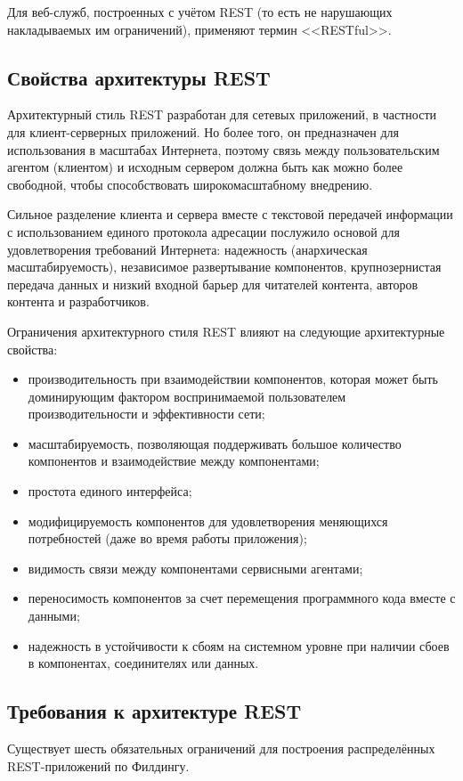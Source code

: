\documentclass[a4page]{article}
\begin{document}
Для веб-служб, построенных с учётом REST (то есть не нарушающих накладываемых им ограничений),
применяют термин <<RESTful>>.

\subsection{Свойства архитектуры REST}
Архитектурный стиль REST разработан для сетевых приложений,
в частности для клиент-серверных приложений.
Но более того, он предназначен для использования в масштабах Интернета,
поэтому связь между пользовательским агентом (клиентом) и
исходным сервером должна быть как можно более свободной, чтобы способствовать широкомасштабному внедрению.

Сильное разделение клиента и сервера вместе с текстовой передачей информации
с использованием единого протокола адресации послужило основой для удовлетворения требований Интернета:
надежность (анархическая масштабируемость), независимое развертывание компонентов,
крупнозернистая передача данных и низкий входной барьер для читателей контента,
авторов контента и разработчиков.

Ограничения архитектурного стиля REST влияют на следующие архитектурные свойства:

\begin{itemize}
	\item производительность при взаимодействии компонентов,
	      которая может быть доминирующим фактором воспринимаемой пользователем производительности и эффективности сети;
	\item масштабируемость, позволяющая поддерживать большое количество компонентов
	      и взаимодействие между компонентами;
	\item простота единого интерфейса;
	\item модифицируемость компонентов для удовлетворения меняющихся потребностей
	      (даже во время работы приложения);
	\item видимость связи между компонентами сервисными агентами;
	\item переносимость компонентов за счет перемещения программного кода вместе с данными;
	\item надежность в устойчивости к сбоям на системном уровне при наличии сбоев в компонентах,
	      соединителях или данных.
\end{itemize}

\subsection{Требования к архитектуре REST}
Существует шесть обязательных ограничений для построения распределённых REST-приложений по Филдингу.
\end{document}
